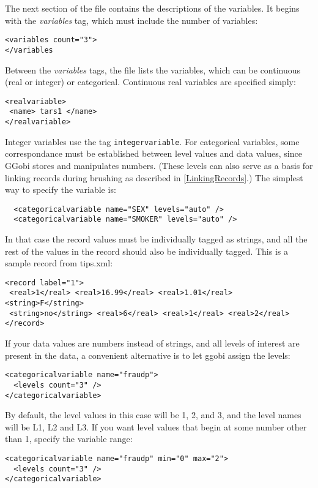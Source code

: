 \documentclass{article}
\def\XMLTag#1{\textit{#1}}
\def\XMLElement#1{\XMLTag{#1}}
\begin{document}
The next section of the file contains the descriptions of
the variables.  It begins with the \XMLElement{variables} tag,
which must include the number of variables:

\begin{verbatim}
<variables count="3">
</variables
\end{verbatim}
%
Between the \XMLElement{variables} tags, the file lists the variables,
which can be continuous (real or integer) or categorical.  Continuous
real variables are specified simply:
\begin{verbatim}
<realvariable>
 <name> tars1 </name>
</realvariable>
\end{verbatim}
Integer variables use the tag \texttt{integervariable}.
% 
For categorical variables, some correspondance must be established
between level values and data values, since GGobi stores and
manipulates numbers. (These levels can also serve as a basis for
linking records during brushing as described in \ref{LinkingRecords}.)
The simplest way to specify the variable is:
%
\begin{verbatim}
  <categoricalvariable name="SEX" levels="auto" />
  <categoricalvariable name="SMOKER" levels="auto" />
\end{verbatim}
%
In that case the record values must be individually tagged as strings,
and all the rest of the values in the record should also be individually
tagged.  This is a sample record from tips.xml:
%
\begin{verbatim}
<record label="1">
 <real>1</real> <real>16.99</real> <real>1.01</real> <string>F</string>
 <string>no</string> <real>6</real> <real>1</real> <real>2</real>
</record>
\end{verbatim}

If your data values are numbers instead of strings, and all levels of
interest are present in the data, a convenient alternative is to let
ggobi assign the levels:
%
\begin{verbatim}
<categoricalvariable name="fraudp">
  <levels count="3" />
</categoricalvariable>
\end{verbatim}
%
By default, the level values in this case will be 1, 2, and 3, and
the level names will be L1, L2 and L3.  If you want level values
that begin at some number other than 1, specify the variable range: 
%
\begin{verbatim}
<categoricalvariable name="fraudp" min="0" max="2">
  <levels count="3" />
</categoricalvariable>
\end{verbatim}
\end{document}
